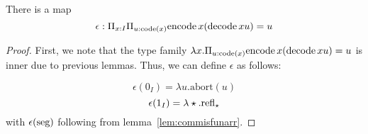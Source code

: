\documentclass[main.tex]{subfiles}
\begin{document}
\begin{lemma}
    There is a map 
    $$ \epsilon : \Pi_{x : I} \Pi_{u : \text{code}(x)} \normalfont \text{encode} \, x (\text{decode} \, x u) = u$$
\end{lemma}
\begin{proof}
First, we note that the type family $\lambda x.\Pi_{u : \text{code}(x)} \normalfont \text{encode} \, x (\text{decode} \, x u) = u $ is inner due to previous lemmas. Thus, we can define $\epsilon$ as follows:

$$\epsilon(0_I) = \lambda u. \text{abort}(u)$$
$$\epsilon(1_I) = \lambda \star. \text{refl}_{\star}$$
with $\epsilon(\text{seg})$ following from lemma~\ref{lem:commisfunarr}.
\end{proof}
\end{document}
